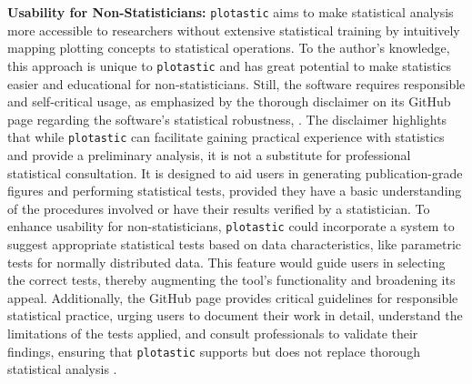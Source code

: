 \textbf{Usability for Non-Statisticians:} \texttt{plotastic} aims to make
statistical analysis more accessible to researchers without extensive
statistical training by intuitively mapping plotting concepts to statistical
operations. To the author's knowledge, this approach is unique to
\texttt{plotastic} and has great potential to make statistics easier and
educational for non-statisticians. Still, the software requires responsible and
self-critical usage, as emphasized by the thorough disclaimer on its GitHub page
regarding the software's statistical robustness,
\cite{kuricMarkur4Plotastic2024}. The disclaimer highlights that while
\texttt{plotastic} can facilitate gaining practical experience with statistics
and provide a preliminary analysis, it is not a substitute for professional
statistical consultation. It is designed to aid users in generating
publication-grade figures and performing statistical tests, provided they have a
basic understanding of the procedures involved or have their results verified by
a statistician. To enhance usability for non-statisticians, \texttt{plotastic}
could incorporate a system to suggest appropriate statistical tests based on
data characteristics, like parametric tests for normally distributed data. This
feature would guide users in selecting the correct tests, thereby augmenting the
tool's functionality and broadening its appeal. Additionally, the GitHub page
provides critical guidelines for responsible statistical practice, urging users
to document their work in detail, understand the limitations of the tests
applied, and consult professionals to validate their findings, ensuring that
\texttt{plotastic} supports but does not replace thorough statistical analysis
\cite{sandveTenSimpleRules2013, kuricMarkur4Plotastic2024}.



